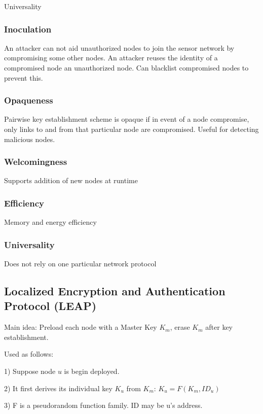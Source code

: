 \documentclass[10pt]{article}
\begin{document}
Universality

\subsubsection{Inoculation}

An attacker can not aid unauthorized nodes to join the sensor network by compromising some other nodes. An attacker reuses the identity of a compromised node an unauthorized node. Can blacklist compromised nodes to prevent this. 

\subsubsection{Opaqueness}

Pairwise key establishment scheme is opaque if in event of a node compromise, only links to and from that particular node are compromised. Useful for detecting malicious nodes.

\subsubsection{Welcomingness}

Supports addition of new nodes at runtime

\subsubsection{Efficiency}

Memory and energy efficiency

\subsubsection{Universality}

Does not rely on one particular network protocol

\subsection{Localized Encryption and Authentication Protocol (LEAP)}

Main idea: Preload each node with a Master Key $K_m$, erase $K_m$ after key establishment.

Used as follows:

1) Suppose node $u$ is begin deployed.

2) It first derives its individual key $K_u$ from $K_m$: $K_u = F(K_m, ID_u)$

3) F is a pseudorandom function family. ID may be u's address.
\end{document}
